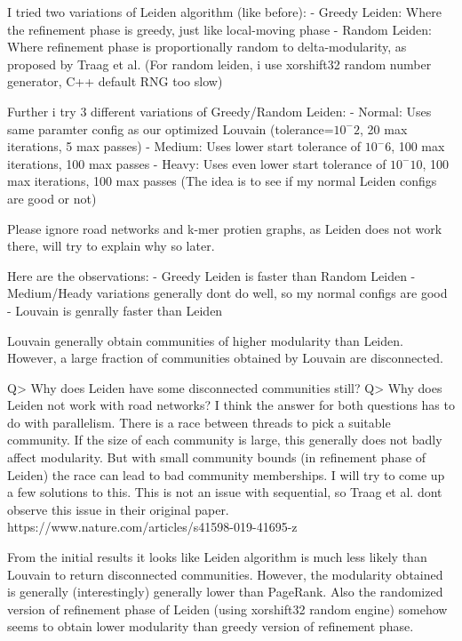 I tried two variations of Leiden algorithm (like before):
- Greedy Leiden: Where the refinement phase is greedy, just like local-moving phase
- Random Leiden: Where refinement phase is proportionally random to delta-modularity, as proposed by Traag et al.
(For random leiden, i use xorshift32 random number generator, C++ default RNG too slow)

Further i try 3 different variations of Greedy/Random Leiden:
- Normal: Uses same paramter config as our optimized Louvain (tolerance=$10^-2$, 20 max iterations, 5 max passes)
- Medium: Uses lower start tolerance of $10^-6$, 100 max iterations, 100 max passes
- Heavy: Uses even lower start tolerance of $10^-10$, 100 max iterations, 100 max passes
(The idea is to see if my normal Leiden configs are good or not)

Please ignore road networks and k-mer protien graphs, as Leiden does not work there, will try to explain why so later.

Here are the observations:
- Greedy Leiden is faster than Random Leiden
- Medium/Heady variations generally dont do well, so my normal configs are good
- Louvain is genrally faster than Leiden

Louvain generally obtain communities of higher modularity than Leiden.
However, a large fraction of communities obtained by Louvain are disconnected.

Q> Why does Leiden have some disconnected communities still?
Q> Why does Leiden not work with road networks?
I think the answer for both questions has to do with parallelism. There is a race between threads to pick a suitable community. If the size of each community is large, this generally does not badly affect modularity. But with small community bounds (in refinement phase of Leiden) the race can lead to bad community memberships. I will try to come up a few solutions to this. This is not an issue with sequential, so Traag et al. dont observe this issue in their original paper.
https://www.nature.com/articles/s41598-019-41695-z

From the initial results it looks like Leiden algorithm is much less likely than Louvain to return disconnected communities. However, the modularity obtained is generally (interestingly) generally lower than PageRank. Also the randomized version of refinement phase of Leiden (using xorshift32 random engine) somehow seems to obtain lower modularity than greedy version of refinement phase.




